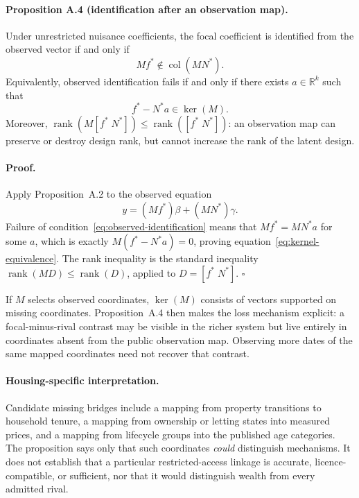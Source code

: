 \paragraph{Proposition A.4 (identification after an observation map).}
Under unrestricted nuisance coefficients, the focal coefficient is identified
from the observed vector if and only if
\begin{equation}
  Mf^*\notin\operatorname{col}(MN^*).
  \label{eq:observed-identification}
\end{equation}
Equivalently, observed identification fails if and only if there exists
\(a\in\mathbb R^k\) such that
\begin{equation}
  f^*-N^*a\in\ker(M).
  \label{eq:kernel-equivalence}
\end{equation}
Moreover,
\(\operatorname{rank}(M[f^*\;N^*])
\leq\operatorname{rank}([f^*\;N^*])\): an observation map can preserve or
destroy design rank, but cannot increase the rank of the latent design.

\paragraph{Proof.}
Apply Proposition~A.2 to the observed equation
\[
  y=(Mf^*)\beta+(MN^*)\gamma.
\]
Failure of condition~\eqref{eq:observed-identification} means that
\(Mf^*=MN^*a\) for some \(a\), which is exactly
\(M(f^*-N^*a)=0\), proving equation~\eqref{eq:kernel-equivalence}. The rank
inequality is the standard inequality
\(\operatorname{rank}(MD)\leq\operatorname{rank}(D)\), applied to
\(D=[f^*\;N^*]\).
\(\square\)

If \(M\) selects observed coordinates, \(\ker(M)\) consists of vectors
supported on missing coordinates. Proposition~A.4 then makes the loss
mechanism explicit: a focal-minus-rival contrast may be visible in the richer
system but live entirely in coordinates absent from the public observation
map. Observing more dates of the same mapped coordinates need not recover that
contrast.

\paragraph{Housing-specific interpretation.}
Candidate missing bridges include a mapping from property transitions to
household tenure, a mapping from ownership or letting states into measured
prices, and a mapping from lifecycle groups into the published age categories.
The proposition says only that such coordinates \emph{could} distinguish
mechanisms. It does not establish that a particular restricted-access linkage
is accurate, licence-compatible, or sufficient, nor that it would distinguish
wealth from every admitted rival.

